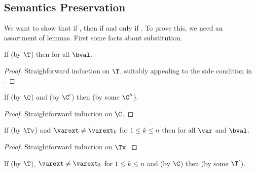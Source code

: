 \subsection{Semantics Preservation}

We want to show that if \trahb{\envnil}{\envnil}{\bexp}{\hexp}, then \hev{\hexp}{\n{\nat}} if and only if \bev{\envnil}{\bexp}{\n{\nat}}.
To prove this, we need an assortment of lemmas.
First some facts about substitution.

\begin{lemma}[Shadowing]
\label{lem:shadowing}
If  (by $\T$) then  for all $\bval$.
\end{lemma}

\begin{proof}
Straighforward induction on $\T$, suitably appealing to the side condition in .
\end{proof}

\begin{lemma}
\label{lem:substitution-cor}
If \corhb{\hbxtx}{\bvalext}{\hexp} (by $\C$) and  (by $\C'$) then  (by some $\C''$).
\end{lemma}

\begin{proof}
Straightforward induction on $\C$.
\end{proof}

\begin{lemma}
\label{lem:substitution-lookup}
If  (by $\Tv$) and $\varext \neq \varext_k$ for $1 \le k \le n$ then  for all $\var$ and $\bval$.
\end{lemma}

\begin{proof}
Straightforward induction on $\Tv$.
\end{proof}

\begin{lemma}
\label{lem:substitution-trans}
If  (by $\T$), $\varext \neq \varext_k$ for $1 \le k \le n$ and \corhb{\benv}{\bval}{\hval} (by $\C$) then  (by some $\T'$).
\end{lemma}

